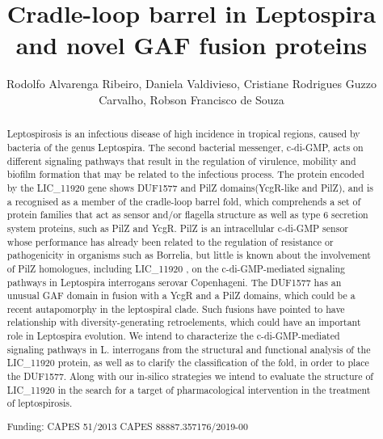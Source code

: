 \documentclass[twoside]{article}
\title{\vspace{-15mm}\fontsize{24pt}{10pt}\selectfont\textbf{ Cradle-loop barrel in Leptospira and novel GAF fusion proteins }} %
\author{ Rodolfo Alvarenga Ribeiro, Daniela Valdivieso, Cristiane Rodrigues Guzzo Carvalho, Robson Francisco de Souza }
\affil{ Institute of Biomedical Sciences,  USP }
\date{}
\begin{document}
  
  
  \maketitle %
  
  
  \thispagestyle{fancy} %
  
  
  \begin{abstract}
  Leptospirosis is an infectious disease of high incidence in tropical regions,  caused by bacteria of the genus Leptospira. The second bacterial messenger,  c-di-GMP,  acts on different signaling pathways that result in the regulation of virulence,  mobility and biofilm formation that may be related to the infectious process. The protein encoded by the LIC\_11920 gene shows DUF1577 and PilZ domains(YcgR-like and PilZ),  and is a recognised as a member of the cradle-loop barrel fold,  which comprehends a set of protein families that act as sensor and/or flagella structure as well as type 6 secretion system proteins,  such as PilZ and YcgR. PilZ is an intracellular c-di-GMP sensor whose performance has already been related to the regulation of resistance or pathogenicity in organisms such as Borrelia,  but little is known about the involvement of PilZ homologues,  including LIC\_11920 ,  on the c-di-GMP-mediated signaling pathways in Leptospira interrogans serovar Copenhageni. The DUF1577 has an unusual GAF domain in fusion with a YcgR and a PilZ domains,  which could be a recent autapomorphy in the leptospiral clade. Such fusions have pointed to have relationship with diversity-generating retroelements,  which could have an important role in Leptospira evolution. We intend to characterize the c-di-GMP-mediated signaling pathways in L. interrogans from the structural and functional analysis of the LIC\_11920 protein,  as well as to clarify the classification of the fold,  in order to place the DUF1577.  Along with our in-silico strategies we intend to evaluate the structure of LIC\_11920 in the search for a target of pharmacological intervention in the treatment of leptospirosis.
  
  Funding: CAPES 51/2013 CAPES 88887.357176/2019-00 \\ 
  \end{abstract}
  
\end{document}
